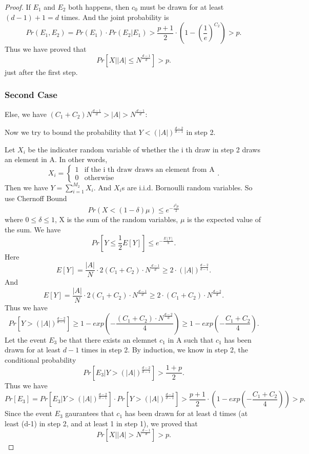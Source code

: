\documentclass{article}
\begin{document}
\begin{spacing}{1.1}
\begin{proof}
    If $E_1$ and $E_2$ both happens, then $c_0$ must be drawn for at least $(d-1) + 1 = d$ times. And the joint probability is
    \begin{equation}
        Pr(E_1, E_2) = Pr(E_1)\cdot Pr(E_2 | E_1) > \frac{p+1}{2} \cdot (1 - (\frac{1}{e})^{C_2}) > p.
    \end{equation}
    Thus we have proved that $$Pr[X | |A| \leq N^{\frac{d-1}{d}}] > p.$$ just after the first step.
    \subsubsection{Second Case}\label{sec-case}
    Else, we have $(C_1 + C_2)N^{\frac{d-1}{d}} > |A| > N^{\frac{d-1}{d}}$:

    Now we try to bound the probability that $Y < (|A|)^{\frac{d-2}{d-1}}$ in step 2.

    Let $X_i$ be the indicater random variable of whether the i th draw in step 2 draws an element in A. In other words,
    \begin{equation}
        X_i = \begin{cases}
            1 & \text{if the i th draw draws an element from A} \\
            0 & \text{otherwise}
        \end{cases}.
    \end{equation}
    Then we have $Y = \sum_{i=1}^{M_2}X_i$. And $X_i$s are i.i.d. Bornoulli random variables. So use Chernoff Bound
    $$ Pr(X < (1 - \delta)\mu) \leq e^{-\frac{\delta^2 \mu}{2}}$$
    where $0\leq \delta \leq 1$, X is the sum of the random variables, $\mu$ is the expected value of the sum.
    We have
    \begin{equation}
        Pr[Y \leq \frac{1}{2}E[Y]] \leq e^{-\frac{E[Y]}{8}}.
    \end{equation}
    Here
    $$E[Y] = \frac{|A|}{N} \cdot 2(C_1 + C_2)\cdot N^{\frac{d-1}{d}} \geq 2\cdot (|A|)^{\frac{d-2}{d-1}}.$$
    And
    $$E[Y] = \frac{|A|}{N} \cdot 2(C_1 + C_2)\cdot N^{\frac{d-1}{d}} \geq 2\cdot (C_1 + C_2)\cdot N^{\frac{d-2}{d}}.$$
    Thus we have
    $$Pr[Y > (|A|)^{\frac{d-2}{d-1}}] \geq 1 - exp(-\frac{(C_1 + C_2)\cdot N^{\frac{d-2}{d}}}{4}) \geq 1 - exp(-\frac{C_1 + C_2}{4}).$$
    Let the event $E_3$ be that there exists an elemnet $c_1$ in A such that $c_1$ has been drawn for at least $d-1$ times in step 2. By induction, we know in step 2, the conditional probability
    $$Pr[E_3 | Y > (|A|)^{\frac{d-2}{d-1}}] > \frac{1+p}{2}.$$
    Thus we have
    \begin{equation}
        Pr[E_3] = Pr[E_3 | Y > (|A|)^{\frac{d-2}{d-1}}]\cdot Pr[Y > (|A|)^{\frac{d-2}{d-1}}] > \frac{p+1}{2}\cdot (1 - exp(-\frac{C_1 + C_2}{4})) > p.
    \end{equation}
    Since the event $E_3$ gaurantees that $c_1$ has been drawn for at least d times (at least (d-1) in step 2, and at least 1 in step 1), we proved that
    $$Pr[X | |A| > N^{\frac{d-1}{d}}] > p.$$


\end{proof}
\end{spacing}
\end{document}
